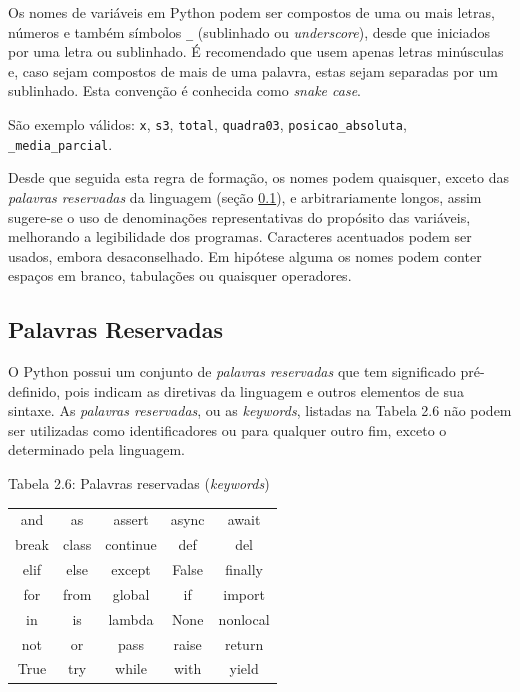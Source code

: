 \documentclass[
]{book}
\begin{document}
Os nomes de variáveis em Python podem ser compostos de uma ou mais letras, números e também símbolos \texttt{\_} (sublinhado ou \emph{underscore}), desde que iniciados por uma letra ou sublinhado. É recomendado que usem apenas letras minúsculas e, caso sejam compostos de mais de uma palavra, estas sejam separadas por um sublinhado. Esta convenção é conhecida como \emph{snake case}.

São exemplo válidos: \texttt{x}, \texttt{s3}, \texttt{total}, \texttt{quadra03}, \texttt{posicao\_absoluta}, \texttt{\_media\_parcial}.

Desde que seguida esta regra de formação, os nomes podem quaisquer, exceto das \emph{palavras reservadas} da linguagem (seção \ref{comput-varia-reser}), e arbitrariamente longos, assim sugere-se o uso de denominações representativas do propósito das variáveis, melhorando a legibilidade dos programas. Caracteres acentuados podem ser usados, embora desaconselhado. Em hipótese alguma os nomes podem conter espaços em branco, tabulações ou quaisquer operadores.

\hypertarget{comput-varia-reser}{%
\subsection{Palavras Reservadas}\label{comput-varia-reser}}

O Python possui um conjunto de \emph{palavras reservadas} que tem significado pré-definido, pois indicam as diretivas da linguagem e outros elementos de sua sintaxe. As \emph{palavras reservadas}, ou as \emph{keywords}, listadas na Tabela 2.6 não podem ser utilizadas como identificadores ou para qualquer outro fim, exceto o determinado pela linguagem.

Tabela 2.6: Palavras reservadas (\emph{keywords})

\begin{longtable}[]{@{}ccccc@{}}
\toprule
& & & & \\
\midrule
\endhead
and & as & assert & async & await \\
break & class & continue & def & del \\
elif & else & except & False & finally \\
for & from & global & if & import \\
in & is & lambda & None & nonlocal \\
not & or & pass & raise & return \\
True & try & while & with & yield \\
\bottomrule
\end{longtable}
\end{document}
